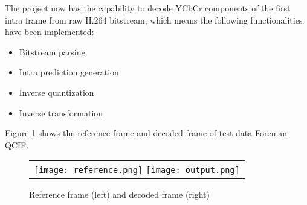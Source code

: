 \documentclass[../main.tex]{subfiles}
\begin{document}
The project now has the capability to decode YCbCr components of the first intra frame from raw H.264 bitstream,
which means the following functionalities have been implemented:

\begin{itemize}
\item Bitstream parsing
\item Intra prediction generation
\item Inverse quantization
\item Inverse transformation
\end{itemize}

Figure \ref{fig:output} shows the reference frame and decoded frame of test data Foreman QCIF.

\begin{figure} [ht]
\begin{center}
\begin{tabular}{c} %
\texttt{[image: reference.png]}
\texttt{[image: output.png]}
\end{tabular}
\end{center}
\caption[output] 
{ \label{fig:output} Reference frame (left) and decoded frame (right)}
\end{figure} 
\end{document}
